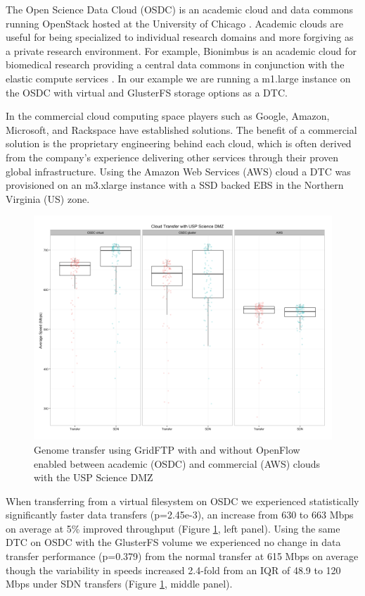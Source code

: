 \documentclass{sig-alternate-05-2015}
\begin{document}
The Open Science Data Cloud (OSDC) is an academic cloud and data commons running OpenStack hosted at the University of Chicago \cite{Stein2015}. Academic clouds are useful for being specialized to individual research domains and more forgiving as a private research environment. For example, Bionimbus is an academic cloud for biomedical research providing a central data commons in conjunction with the elastic compute services \cite{Heath2014}. In our example we are running a m1.large instance on the OSDC with virtual and GlusterFS storage options as a DTC.

In the commercial cloud computing space players such as Google, Amazon, Microsoft, and Rackspace have established solutions. The benefit of a commercial solution is the proprietary engineering behind each cloud, which is often derived from the company's experience delivering other services through their proven global infrastructure. Using the Amazon Web Services (AWS) cloud a DTC was provisioned on an m3.xlarge instance with a SSD backed EBS in the Northern Virginia (US) zone. 

\begin{figure}
\centering
\includegraphics[scale=0.23]{images/cloud.png}
\caption{Genome transfer using GridFTP with and without OpenFlow enabled between academic (OSDC) and commercial (AWS) clouds with the USP Science DMZ}
\label{fig:cloud}
\end{figure}

When transferring from a virtual filesystem on OSDC we experienced statistically significantly faster data transfers (p=2.45e-3), an increase from 630 to 663 Mbps on average at 5\% improved throughput (Figure \ref{fig:cloud}, left panel). Using the same DTC on OSDC with the GlusterFS volume we experienced no change in data transfer performance (p=0.379) from the normal transfer at 615 Mbps on average though the variability in speeds increased 2.4-fold from an IQR of 48.9 to 120 Mbps under SDN transfers (Figure \ref{fig:cloud}, middle panel).
\end{document}
